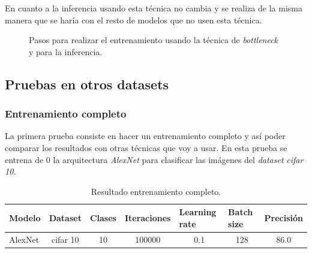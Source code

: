 \documentclass[12pt,a4paper]{article}
\begin{document}
En cuanto a la inferencia usando esta técnica no cambia y se realiza de la misma manera que se haría con el resto de modelos que no usen esta técnica.

\begin{figure}[H]
\centering
{}%
\qquad
{}%
\caption{Pasos para realizar el entrenamiento usando la técnica de \textit{bottleneck} y para la inferencia.}
\end{figure}

\subsection{Pruebas en otros datasets}
\subsubsection{Entrenamiento completo}
La primera prueba consiste en hacer un entrenamiento completo y así poder comparar los resultados con otras técnicas que voy a usar. En esta prueba se entrena de 0 la arquitectura \textit{AlexNet} para clasificar las imágenes del \textit{dataset} \textit{cifar 10}.

\begin{table}[H]
\centering
\begin{tabular}{|l|l|l|l|l|l|l|}
\hline
\textbf{Modelo} & \textbf{Dataset}              & \textbf{Clases}         & \textbf{Iteraciones}        & \textbf{Learning rate}   & \textbf{Batch size}      & \textbf{Precisión}        \\ \hline
AlexNet         & \multicolumn{1}{c|}{cifar 10} & \multicolumn{1}{c|}{10} & \multicolumn{1}{c|}{100000} & \multicolumn{1}{c|}{0.1} & \multicolumn{1}{c|}{128} & \multicolumn{1}{c|}{86.0} \\ \hline
\end{tabular}
\caption{Resultado entrenamiento completo.}
\end{table}
\end{document}
